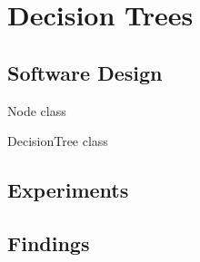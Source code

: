 \section{Decision Trees}

\subsection{Software Design}

\begin{list}{-}{}
    \item Node class
    \item DecisionTree class
\end{list}


\subsection{Experiments}

\subsection{Findings}
